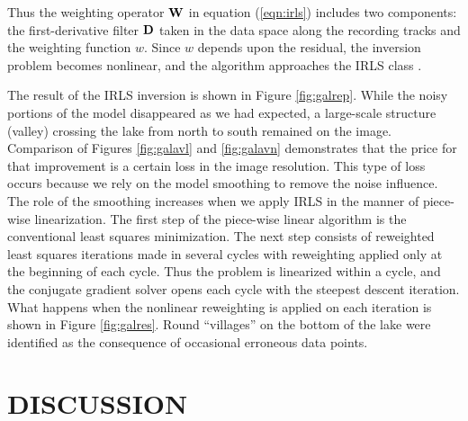 \par
Thus the weighting operator ${\bf W}$ in equation (\ref{eqn:irls}) includes two
components: the first-derivative filter ${\bf D}$ taken in the data space
along the recording tracks and the weighting function $w$. Since $w$
depends upon the residual, the inversion problem becomes nonlinear,
and the algorithm approaches the IRLS class \cite{SEG.1988.S7.1}. 
\par
The result of the IRLS inversion is shown in Figure
\ref{fig:galrep}. While the noisy
portions of the model disappeared as we had
expected, a large-scale structure (valley) crossing the lake from north to
south remained on the image.
Comparison of Figures
\ref{fig:galavl} and \ref{fig:galavn} demonstrates that the price for that
improvement is a certain loss in the
image resolution. This type of loss occurs because we rely on the
model smoothing to remove the noise influence. The role of the smoothing
increases when we apply IRLS in the manner of piece-wise
linearization. The first step of the piece-wise linear algorithm is
the conventional least squares minimization. The next step consists of
reweighted least squares iterations made in several cycles with reweighting
applied only at the beginning of each cycle. Thus the problem is linearized
within a cycle, and the conjugate gradient solver opens each cycle with the
steepest descent iteration. 
What happens when the nonlinear reweighting is applied on each
iteration is shown in Figure \ref{fig:galres}. Round
``villages'' on the bottom of the lake were identified as the
consequence of
occasional erroneous data points. 



\section{DISCUSSION}
 
